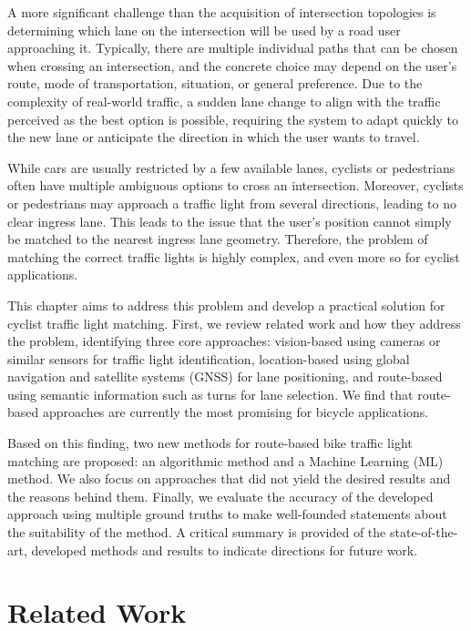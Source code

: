 A more significant challenge than the acquisition of intersection topologies is determining which lane on the intersection will be used by a road user approaching it. Typically, there are multiple individual paths that can be chosen when crossing an intersection, and the concrete choice may depend on the user's route, mode of transportation, situation, or general preference. Due to the complexity of real-world traffic, a sudden lane change to align with the traffic perceived as the best option is possible, requiring the system to adapt quickly to the new lane or anticipate the direction in which the user wants to travel. 

While cars are usually restricted by a few available lanes, cyclists or pedestrians often have multiple ambiguous options to cross an intersection. Moreover, cyclists or pedestrians may approach a traffic light from several directions, leading to no clear ingress lane. This leads to the issue that the user's position cannot simply be matched to the nearest ingress lane geometry. Therefore, the problem of matching the correct traffic lights is highly complex, and even more so for cyclist applications.

This chapter aims to address this problem and develop a practical solution for cyclist traffic light matching. First, we review related work and how they address the problem, identifying three core approaches: vision-based using cameras or similar sensors for traffic light identification, location-based using global navigation and satellite systems (GNSS) for lane positioning, and route-based using semantic information such as turns for lane selection. We find that route-based approaches are currently the most promising for bicycle applications. 

Based on this finding, two new methods for route-based bike traffic light matching are proposed: an algorithmic method and a Machine Learning (ML) method. We also focus on approaches that did not yield the desired results and the reasons behind them. Finally, we evaluate the accuracy of the developed approach using multiple ground truths to make well-founded statements about the suitability of the method. A critical summary is provided of the state-of-the-art, developed methods and results to indicate directions for future work.

\section{Related Work}

